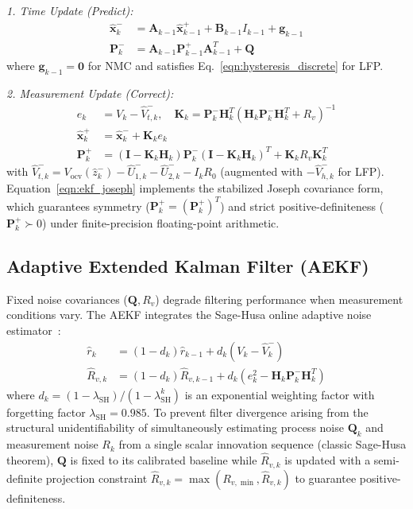 \documentclass[balance,nocopyright,upint,varvw,hyphenate,barcolor=NavyBlue,nolists]{asmejour}
\begin{document}
\emph{1. Time Update (Predict):}
\begin{align}
\hat{\mathbf{x}}_k^- &= \mathbf{A}_{k-1} \hat{\mathbf{x}}_{k-1}^+ + \mathbf{B}_{k-1} I_{k-1} + \mathbf{g}_{k-1} \label{eqn:ekf_pred_state}\\
\mathbf{P}_k^- &= \mathbf{A}_{k-1} \mathbf{P}_{k-1}^+ \mathbf{A}_{k-1}^T + \mathbf{Q} \label{eqn:ekf_pred_cov}
\end{align}
where $\mathbf{g}_{k-1} = \mathbf{0}$ for NMC and satisfies Eq.~\eqref{eqn:hysteresis_discrete} for LFP.

\emph{2. Measurement Update (Correct):}
\begin{align}
e_k &= V_k - \hat{V}_{t,k}^-, \quad \mathbf{K}_k = \mathbf{P}_k^- \mathbf{H}_k^T \left( \mathbf{H}_k \mathbf{P}_k^- \mathbf{H}_k^T + R_v \right)^{-1} \label{eqn:ekf_gain}\\
\hat{\mathbf{x}}_k^+ &= \hat{\mathbf{x}}_k^- + \mathbf{K}_k e_k \label{eqn:ekf_upd_state}\\
\mathbf{P}_k^+ &= (\mathbf{I} - \mathbf{K}_k \mathbf{H}_k) \mathbf{P}_k^- (\mathbf{I} - \mathbf{K}_k \mathbf{H}_k)^T + \mathbf{K}_k R_v \mathbf{K}_k^T \label{eqn:ekf_joseph}
\end{align}
with $\hat{V}_{t,k}^- = V_{\text{ocv}}(\hat{z}_k^-) - \hat{U}_{1,k}^- - \hat{U}_{2,k}^- - I_k R_0$ (augmented with $-\hat{V}_{h,k}^-$ for LFP). Equation~\eqref{eqn:ekf_joseph} implements the stabilized Joseph covariance form, which guarantees symmetry ($\mathbf{P}_k^+ = (\mathbf{P}_k^+)^T$) and strict positive-definiteness ($\mathbf{P}_k^+ \succ 0$) under finite-precision floating-point arithmetic.

\subsection{Adaptive Extended Kalman Filter (AEKF)}
Fixed noise covariances ($\mathbf{Q}, R_v$) degrade filtering performance when measurement conditions vary. The AEKF integrates the Sage-Husa online adaptive noise estimator~\cite{Han2019aekf}:
\begin{align}
\hat{r}_k &= (1 - d_k)\hat{r}_{k-1} + d_k \left( V_k - \hat{V}_k^- \right) \label{eqn:sh_mean}\\
\hat{R}_{v,k} &= (1 - d_k)\hat{R}_{v,k-1} + d_k \left( e_k^2 - \mathbf{H}_k \mathbf{P}_k^- \mathbf{H}_k^T \right) \label{eqn:sh_meas_cov}
\end{align}
where $d_k = (1 - \lambda_{\text{SH}}) / (1 - \lambda_{\text{SH}}^{k})$ is an exponential weighting factor with forgetting factor $\lambda_{\text{SH}} = 0.985$. To prevent filter divergence arising from the structural unidentifiability of simultaneously estimating process noise $\mathbf{Q}_k$ and measurement noise $R_k$ from a single scalar innovation sequence (classic Sage-Husa theorem), $\mathbf{Q}$ is fixed to its calibrated baseline while $\hat{R}_{v,k}$ is updated with a semi-definite projection constraint $\hat{R}_{v,k} = \max(R_{v,\min}, \hat{R}_{v,k})$ to guarantee positive-definiteness.
\end{document}
